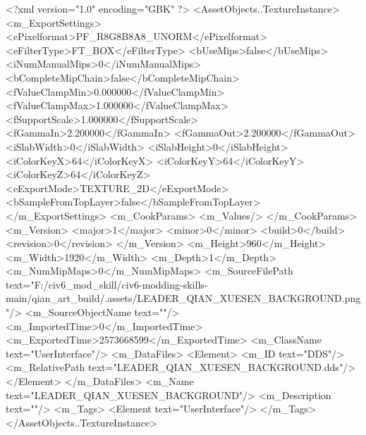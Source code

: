 <?xml version="1.0" encoding="GBK" ?>
<AssetObjects..TextureInstance>
	<m_ExportSettings>
		<ePixelformat>PF_R8G8B8A8_UNORM</ePixelformat>
		<eFilterType>FT_BOX</eFilterType>
		<bUseMips>false</bUseMips>
		<iNumManualMips>0</iNumManualMips>
		<bCompleteMipChain>false</bCompleteMipChain>
		<fValueClampMin>0.000000</fValueClampMin>
		<fValueClampMax>1.000000</fValueClampMax>
		<fSupportScale>1.000000</fSupportScale>
		<fGammaIn>2.200000</fGammaIn>
		<fGammaOut>2.200000</fGammaOut>
		<iSlabWidth>0</iSlabWidth>
		<iSlabHeight>0</iSlabHeight>
		<iColorKeyX>64</iColorKeyX>
		<iColorKeyY>64</iColorKeyY>
		<iColorKeyZ>64</iColorKeyZ>
		<eExportMode>TEXTURE_2D</eExportMode>
		<bSampleFromTopLayer>false</bSampleFromTopLayer>
	</m_ExportSettings>
	<m_CookParams>
		<m_Values/>
	</m_CookParams>
	<m_Version>
		<major>1</major>
		<minor>0</minor>
		<build>0</build>
		<revision>0</revision>
	</m_Version>
	<m_Height>960</m_Height>
	<m_Width>1920</m_Width>
	<m_Depth>1</m_Depth>
	<m_NumMipMaps>0</m_NumMipMaps>
	<m_SourceFilePath text="F:/civ6_mod_skill/civ6-modding-skills-main/qian_art_build/.assets/LEADER_QIAN_XUESEN_BACKGROUND.png"/>
	<m_SourceObjectName text=""/>
	<m_ImportedTime>0</m_ImportedTime>
	<m_ExportedTime>2573668599</m_ExportedTime>
	<m_ClassName text="UserInterface"/>
	<m_DataFiles>
		<Element>
			<m_ID text="DDS"/>
			<m_RelativePath text="LEADER_QIAN_XUESEN_BACKGROUND.dds"/>
		</Element>
	</m_DataFiles>
	<m_Name text="LEADER_QIAN_XUESEN_BACKGROUND"/>
	<m_Description text=""/>
	<m_Tags>
		<Element text="UserInterface"/>
	</m_Tags>
</AssetObjects..TextureInstance>
